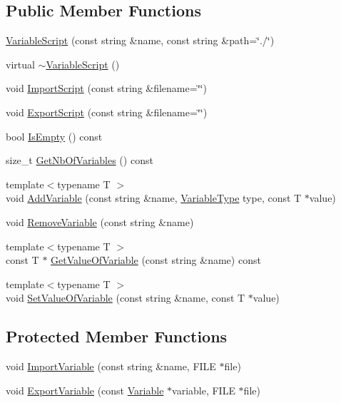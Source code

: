 \subsection*{Public Member Functions}
\begin{DoxyCompactItemize}
\item 
\hyperlink{classmage_1_1_variable_script_a8b40c66f4f025bbf85b60ac57eb92248}{Variable\+Script} (const string \&name, const string \&path=\char`\"{}./\char`\"{})
\item 
virtual \hyperlink{classmage_1_1_variable_script_a8c488e779a6444559bded669a3e038c8}{$\sim$\+Variable\+Script} ()
\item 
void \hyperlink{classmage_1_1_variable_script_a24268eb0ad76b0ead392f341b55d641a}{Import\+Script} (const string \&filename=\char`\"{}\char`\"{})
\item 
void \hyperlink{classmage_1_1_variable_script_a863930f2c84786c2bb5bfa090cda06f7}{Export\+Script} (const string \&filename=\char`\"{}\char`\"{})
\item 
bool \hyperlink{classmage_1_1_variable_script_a8ae619cdc5519a753780360abab87430}{Is\+Empty} () const
\item 
size\+\_\+t \hyperlink{classmage_1_1_variable_script_a27ed94a510a3dab0e60b42b650ca6f09}{Get\+Nb\+Of\+Variables} () const
\item 
{\footnotesize template$<$typename T $>$ }\\void \hyperlink{classmage_1_1_variable_script_aa9a8bb9b6133ce853052820961320ca9}{Add\+Variable} (const string \&name, \hyperlink{namespacemage_a530428e73bac0ba7fe84b29086a9e33a}{Variable\+Type} type, const T $\ast$value)
\item 
void \hyperlink{classmage_1_1_variable_script_a4970ef4faafb1a6a43c4648ec9f36cce}{Remove\+Variable} (const string \&name)
\item 
{\footnotesize template$<$typename T $>$ }\\const T $\ast$ \hyperlink{classmage_1_1_variable_script_a231b83e1e32b882489ed90faa69f7137}{Get\+Value\+Of\+Variable} (const string \&name) const
\item 
{\footnotesize template$<$typename T $>$ }\\void \hyperlink{classmage_1_1_variable_script_a1b6daa6b226e43564408ab54e4c65eb7}{Set\+Value\+Of\+Variable} (const string \&name, const T $\ast$value)
\end{DoxyCompactItemize}
\subsection*{Protected Member Functions}
\begin{DoxyCompactItemize}
\item 
void \hyperlink{classmage_1_1_variable_script_ae7ab24f4d3bb11579ce9cfb690ba7a4f}{Import\+Variable} (const string \&name, F\+I\+LE $\ast$file)
\item 
void \hyperlink{classmage_1_1_variable_script_a69aaa511e7e00912cee95c04cf31b4f5}{Export\+Variable} (const \hyperlink{structmage_1_1_variable}{Variable} $\ast$variable, F\+I\+LE $\ast$file)
\end{DoxyCompactItemize}
